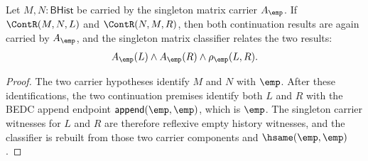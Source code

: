 \begin{theorem}
\label{thm:matrix-singleton-classifier-continuation-comm-closed}
Let $M,N:\mathsf{BHist}$ be carried by the singleton matrix carrier
$A_{\emp}$. If $\ContR(M,N,L)$ and $\ContR(N,M,R)$, then both continuation
results are again carried by $A_{\emp}$, and the singleton matrix classifier
relates the two results:
$$
A_{\emp}(L)\land A_{\emp}(R)\land \rho_{\emp}(L,R).
$$
\end{theorem}
\begin{proof}
The two carrier hypotheses identify $M$ and $N$ with $\emp$. After these
identifications, the two continuation premises identify both $L$ and $R$ with
the BEDC append endpoint $\mathsf{append}(\emp,\emp)$, which is $\emp$. The
singleton carrier witnesses for $L$ and $R$ are therefore reflexive empty
history witnesses, and the classifier is rebuilt from those two carrier
components and $\hsame(\emp,\emp)$.
\end{proof}
